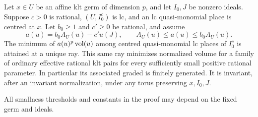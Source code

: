 \begin{proposition}\label{a:exact-penalization}
Let \(x\in U\) be an affine klt germ of dimension \(p\), and let
\(I_0,J\) be nonzero ideals. Suppose \(c>0\) is rational,
\((U,I_0^c)\) is lc, and an lc quasi-monomial place is centred at \(x\).
Let \(b_0\geq1\) and \(c'\geq0\) be rational, and assume
\[
 a(u)=b_0A_U(u)-c'u(J),\qquad A_U(u)\leq a(u)\leq b_0A_U(u).
\]
The minimum of \(a(u)^p\operatorname{vol}(u)\) among centred quasi-monomial lc places
of \(I_0^c\) is attained at a unique ray. This same ray minimizes
normalized volume for a family of ordinary effective rational klt
pairs for every sufficiently small positive rational parameter.
In particular its associated graded is finitely generated.
It is invariant, after an invariant normalization, under any torus
preserving \(x,I_0,J\).

All smallness thresholds and constants in the proof may depend on the
fixed germ and ideals.
\end{proposition}

